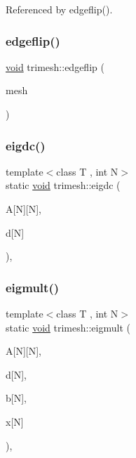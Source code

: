 Referenced by edgeflip().

\mbox{\label{namespacetrimesh_a53d8b8510a41991617d9cccc707460ea}} 
\subsubsection{\texorpdfstring{edgeflip()}{edgeflip()}}
{\footnotesize\ttfamily \hyperlink{namespacetrimesh_a784ddfd979e1c579bda795a8edfc3f43}{void} trimesh\+::edgeflip (\begin{DoxyParamCaption}\item[{\hyperlink{classtrimesh_1_1TriMesh}{Tri\+Mesh} $\ast$}]{mesh }\end{DoxyParamCaption})}

\mbox{\label{namespacetrimesh_ab851c84d883d49aebb9261472b9cfc89}} 
\subsubsection{\texorpdfstring{eigdc()}{eigdc()}}
{\footnotesize\ttfamily template$<$class T , int N$>$ \\
static \hyperlink{namespacetrimesh_a784ddfd979e1c579bda795a8edfc3f43}{void} trimesh\+::eigdc (\begin{DoxyParamCaption}\item[{T(\&)}]{A\mbox{[}\+N\mbox{]}\mbox{[}\+N\mbox{]},  }\item[{T}]{d\mbox{[}\+N\mbox{]} }\end{DoxyParamCaption})\hspace{0.3cm}{\ttfamily [inline]}, {\ttfamily [static]}}

\mbox{\label{namespacetrimesh_a6d938829940c50c8b40dcd35a4e45a5a}} 
\subsubsection{\texorpdfstring{eigmult()}{eigmult()}\hspace{0.1cm}{\footnotesize\ttfamily [1/2]}}
{\footnotesize\ttfamily template$<$class T , int N$>$ \\
static \hyperlink{namespacetrimesh_a784ddfd979e1c579bda795a8edfc3f43}{void} trimesh\+::eigmult (\begin{DoxyParamCaption}\item[{const T(\&)}]{A\mbox{[}\+N\mbox{]}\mbox{[}\+N\mbox{]},  }\item[{const T}]{d\mbox{[}\+N\mbox{]},  }\item[{const T}]{b\mbox{[}\+N\mbox{]},  }\item[{T}]{x\mbox{[}\+N\mbox{]} }\end{DoxyParamCaption})\hspace{0.3cm}{\ttfamily [inline]}, {\ttfamily [static]}}

